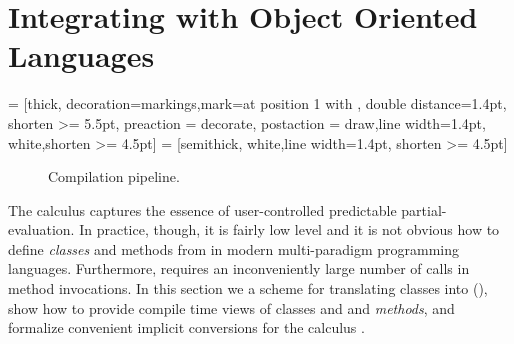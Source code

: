 \section{Integrating \calculus with Object Oriented Languages}
\label{sct:scala-translation}
\usetikzlibrary{arrows, decorations.markings}
 = [thick, decoration={markings,mark=at position
   1 with {}},
   double distance=1.4pt, shorten >= 5.5pt,
   preaction = {decorate},
   postaction = {draw,line width=1.4pt, white,shorten >= 4.5pt}]
 = [semithick, white,line width=1.4pt, shorten >= 4.5pt]

\begin{figure}
\center
{}
\caption{Compilation pipeline.}
\label{fig:phases}
\end{figure}


The \calculus calculus  captures the essence of user-controlled
 predictable partial-evaluation. In practice, though, it is fairly low level and
 it is not obvious how to define \emph{classes} and methods from in modern multi-paradigm
 programming languages. Furthermore, \calculus requires an inconveniently
 large number of  calls in method invocations.
 In this section we a scheme for translating classes into \calculus (),
 show how to provide compile time views of classes and and \emph{methods},
 and formalize convenient implicit conversions for the calculus .

